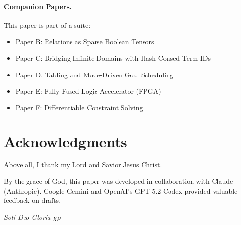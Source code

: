 \documentclass[11pt,a4paper]{article}
\begin{document}
\paragraph{Companion Papers.}
This paper is part of a suite:
\begin{itemize}
  \item Paper B: Relations as Sparse Boolean Tensors
  \item Paper C: Bridging Infinite Domains with Hash-Consed Term IDs
  \item Paper D: Tabling and Mode-Driven Goal Scheduling
  \item Paper E: Fully Fused Logic Accelerator (FPGA)
  \item Paper F: Differentiable Constraint Solving
\end{itemize}

\section*{Acknowledgments}

Above all, I thank my Lord and Savior Jesus Christ.

By the grace of God, this paper was developed in collaboration with Claude
(Anthropic). Google Gemini and OpenAI's GPT-5.2 Codex provided valuable
feedback on drafts.


% 

\vspace{1em}
\begin{center}
\textit{Soli Deo Gloria} $\chi\rho$
\end{center}
\end{document}
